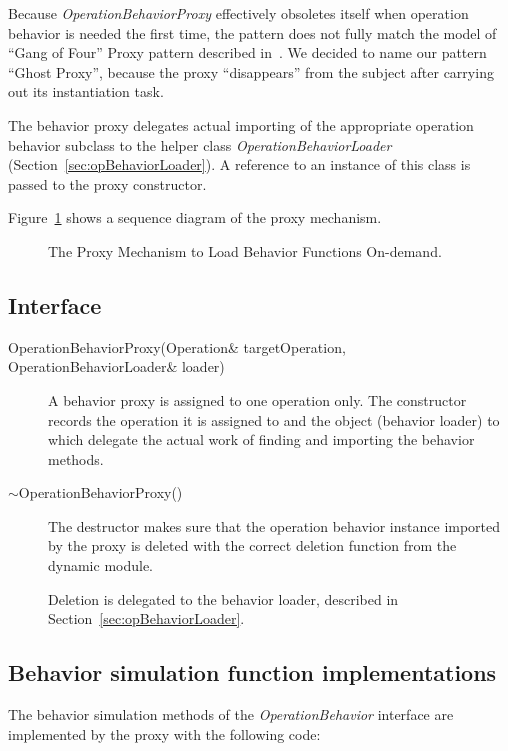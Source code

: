 \documentclass[a4paper,twoside]{tce}
\begin{document}
Because \emph{OperationBehaviorProxy} effectively obsoletes itself when
operation behavior is needed the first time, the pattern does not fully
match the model of ``Gang of Four'' Proxy pattern described
in~\cite{DesignPatterns}.  We decided to name our pattern ``Ghost Proxy'',
because the proxy ``disappears'' from the subject after carrying out its
instantiation task.

The behavior proxy delegates actual importing of the appropriate operation
behavior subclass to the helper class \emph{OperationBehaviorLoader}
(Section~\ref{sec:opBehaviorLoader}).  A reference to an instance of this
class is passed to the proxy constructor.

Figure~\ref{fig:proxySequence} shows a sequence diagram of the proxy
mechanism.

\begin{figure}[tb]
  \centerline{}
  \caption{The Proxy Mechanism to Load Behavior Functions On-demand.}
  \label{fig:proxySequence}
\end{figure}

\subsection{Interface}

\begin{description}
\item[OperationBehaviorProxy(Operation\& targetOperation, OperationBehaviorLoader\& loader)]%
  A behavior proxy is assigned to one operation only.  The constructor
  records the operation it is assigned to and the object (behavior loader)
  to which delegate the actual work of finding and importing the behavior
  methods.

\item[$\sim$OperationBehaviorProxy()]%
  The destructor makes sure that the operation behavior instance imported by
  the proxy is deleted with the correct deletion function from the dynamic
  module.

  Deletion is delegated to the behavior loader, described in
  Section~\ref{sec:opBehaviorLoader}.
\end{description}


\subsection{Behavior simulation function implementations}

The behavior simulation methods of the \emph{OperationBehavior} interface
are implemented by the proxy with the following code:
\end{document}
